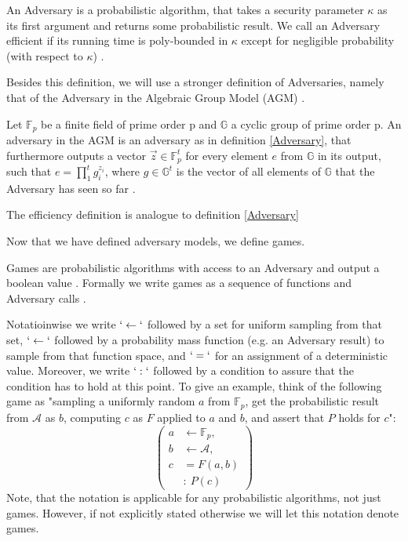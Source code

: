 \begin{definition}
    \label{Adversary}
An Adversary is a probabilistic algorithm, that takes a security parameter $\kappa$ as its first argument and returns some probabilistic result. 
We call an Adversary efficient if its running time is poly-bounded in $\kappa$ except for negligible probability (with respect to $\kappa$)
\parencite{boneh_shoup}.
\end{definition}

Besides this definition, we will use a stronger definition of Adversaries, namely that of the Adversary in the Algebraic Group Model (AGM) \parencite{AGM}.

\begin{definition}
    Let $\mathbb{F}_p$ be a finite field of prime order p and $\mathbb{G}$ a cyclic group of prime order p. An adversary in the AGM is an adversary as in definition \ref{Adversary}, that furthermore outputs a vector $\vec{z} \in \mathbb{F}_p^t$ for every element $e$ from $\mathbb{G}$ in its output, such that $e = \prod_{1}^{t} g_i^{z_i}$, where $g\in \mathbb{G}^t$ is the vector of all elements of $\mathbb{G}$ that the Adversary has seen so far
    \parencite{AGM}. 

    The efficiency definition is analogue to definition \ref*{Adversary}
\end{definition}

Now that we have defined adversary models, we define games. 

\begin{definition}[games]
Games are probabilistic algorithms with access to an Adversary and output a boolean value \parencite{boneh_shoup}. Formally we write games as a sequence of functions and Adversary calls \parencite{boneh_shoup}.
\end{definition}

Notatioinwise we write $`\leftarrow`$ followed by a set for uniform sampling from that set, $`\leftarrow`$ followed by a probability mass function (e.g. an Adversary result) to sample from that function space, and $`=`$ for an assignment of a deterministic value. Moreover, we write $`:`$ followed by a condition to assure that the condition has to hold at this point. To give an example, think of the following game as "sampling a uniformly random $a$ from $\mathbb{F}_p$, get the probabilistic result from $\mathcal{A}$ as $b$, computing $c$ as $F$ applied to $a$ and $b$, and assert that $P$ holds for $c$":
\begin{equation*}
    \left(
    \begin{aligned}
        a & \leftarrow \mathbb{F}_p, \\
        b & \leftarrow \mathcal{A}, \\
        c & = F(a,b) \\
        & : \ P(c)
    \end{aligned}
    \right)
\end{equation*}
Note, that the notation is applicable for any probabilistic algorithms, not just games. However, if not explicitly stated otherwise we will let this notation denote games.


